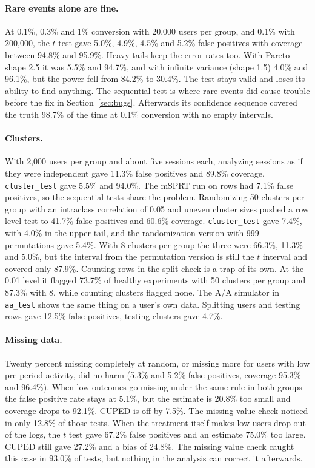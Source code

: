\documentclass[10pt]{article}
\begin{document}
\paragraph{Rare events alone are fine.} At 0.1\%, 0.3\% and 1\% conversion with 20,000 users per group, and 0.1\% with 200,000, the $t$ test gave 5.0\%, 4.9\%, 4.5\% and 5.2\% false positives with coverage between 94.8\% and 95.9\%. Heavy tails keep the error rates too. With Pareto shape 2.5 it was 5.5\% and 94.7\%, and with infinite variance (shape 1.5) 4.0\% and 96.1\%, but the power fell from 84.2\% to 30.4\%. The test stays valid and loses its ability to find anything. The sequential test is where rare events did cause trouble before the fix in Section~\ref{sec:bugs}. Afterwards its confidence sequence covered the truth 98.7\% of the time at 0.1\% conversion with no empty intervals.

\paragraph{Clusters.} With 2,000 users per group and about five sessions each, analyzing sessions as if they were independent gave 11.3\% false positives and 89.8\% coverage. \texttt{cluster\_test} gave 5.5\% and 94.0\%. The mSPRT run on rows had 7.1\% false positives, so the sequential tests share the problem. Randomizing 50 clusters per group with an intraclass correlation of 0.05 and uneven cluster sizes pushed a row level test to 41.7\% false positives and 60.6\% coverage. \texttt{cluster\_test} gave 7.4\%, with 4.0\% in the upper tail, and the randomization version with 999 permutations gave 5.4\%. With 8 clusters per group the three were 66.3\%, 11.3\% and 5.0\%, but the interval from the permutation version is still the $t$ interval and covered only 87.9\%. Counting rows in the split check is a trap of its own. At the 0.01 level it flagged 73.7\% of healthy experiments with 50 clusters per group and 87.3\% with 8, while counting clusters flagged none. The A/A simulator in \texttt{aa\_test} shows the same thing on a user's own data. Splitting users and testing rows gave 12.5\% false positives, testing clusters gave 4.7\%.

\paragraph{Missing data.} Twenty percent missing completely at random, or missing more for users with low pre period activity, did no harm (5.3\% and 5.2\% false positives, coverage 95.3\% and 96.4\%). When low outcomes go missing under the same rule in both groups the false positive rate stays at 5.1\%, but the estimate is 20.8\% too small and coverage drops to 92.1\%. CUPED is off by 7.5\%. The missing value check noticed in only 12.8\% of those tests. When the treatment itself makes low users drop out of the logs, the $t$ test gave 67.2\% false positives and an estimate 75.0\% too large. CUPED still gave 27.2\% and a bias of 24.8\%. The missing value check caught this case in 93.0\% of tests, but nothing in the analysis can correct it afterwards.
\end{document}
